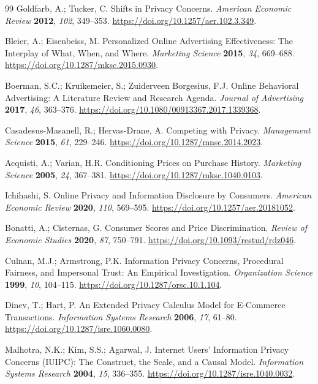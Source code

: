 \begin{thebibliography}{99}
Goldfarb, A.; Tucker, C. Shifts in Privacy Concerns. \textit{American Economic Review} \textbf{2012}, \textit{102}, 349--353. \url{https://doi.org/10.1257/aer.102.3.349}.

Bleier, A.; Eisenbeiss, M. Personalized Online Advertising Effectiveness: The Interplay of What, When, and Where. \textit{Marketing Science} \textbf{2015}, \textit{34}, 669--688. \url{https://doi.org/10.1287/mksc.2015.0930}.

Boerman, S.C.; Kruikemeier, S.; Zuiderveen Borgesius, F.J. Online Behavioral Advertising: A Literature Review and Research Agenda. \textit{Journal of Advertising} \textbf{2017}, \textit{46}, 363--376. \url{https://doi.org/10.1080/00913367.2017.1339368}.

Casadesus-Masanell, R.; Hervas-Drane, A. Competing with Privacy. \textit{Management Science} \textbf{2015}, \textit{61}, 229--246. \url{https://doi.org/10.1287/mnsc.2014.2023}.

Acquisti, A.; Varian, H.R. Conditioning Prices on Purchase History. \textit{Marketing Science} \textbf{2005}, \textit{24}, 367--381. \url{https://doi.org/10.1287/mksc.1040.0103}.

Ichihashi, S. Online Privacy and Information Disclosure by Consumers. \textit{American Economic Review} \textbf{2020}, \textit{110}, 569--595. \url{https://doi.org/10.1257/aer.20181052}.

Bonatti, A.; Cisternas, G. Consumer Scores and Price Discrimination. \textit{Review of Economic Studies} \textbf{2020}, \textit{87}, 750--791. \url{https://doi.org/10.1093/restud/rdz046}.

Culnan, M.J.; Armstrong, P.K. Information Privacy Concerns, Procedural Fairness, and Impersonal Trust: An Empirical Investigation. \textit{Organization Science} \textbf{1999}, \textit{10}, 104--115. \url{https://doi.org/10.1287/orsc.10.1.104}.

Dinev, T.; Hart, P. An Extended Privacy Calculus Model for E-Commerce Transactions. \textit{Information Systems Research} \textbf{2006}, \textit{17}, 61--80. \url{https://doi.org/10.1287/isre.1060.0080}.

Malhotra, N.K.; Kim, S.S.; Agarwal, J. Internet Users' Information Privacy Concerns (IUIPC): The Construct, the Scale, and a Causal Model. \textit{Information Systems Research} \textbf{2004}, \textit{15}, 336--355. \url{https://doi.org/10.1287/isre.1040.0032}.


\end{thebibliography}

